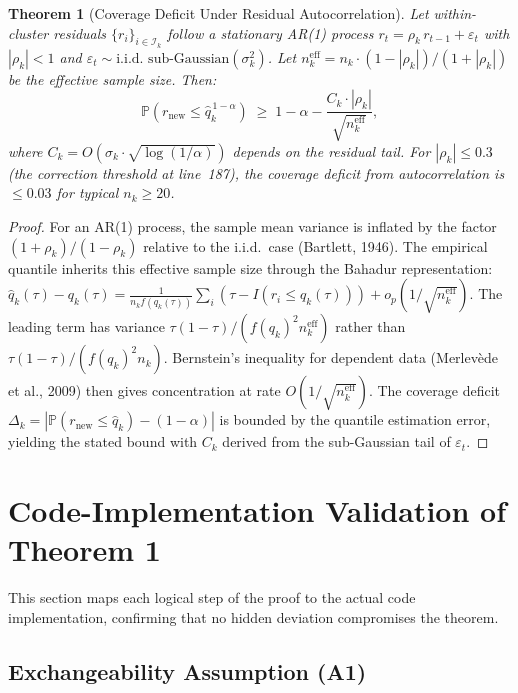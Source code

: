 \documentclass[11pt]{article}
\newtheorem{theorem}{Theorem}[section]
\newcommand{\Pbb}{\mathbb{P}}
\begin{document}
\begin{theorem}[Coverage Deficit Under Residual Autocorrelation]\label{thm:autocorrelation}
Let within-cluster residuals $\{r_i\}_{i \in \mathcal{I}_k}$ follow a stationary AR(1) process $r_t = \rho_k\, r_{t-1} + \varepsilon_t$ with $|\rho_k| < 1$ and $\varepsilon_t \sim \text{i.i.d. sub-Gaussian}(\sigma_k^2)$. Let $n_k^{\text{eff}} = n_k \cdot (1-|\rho_k|)/(1+|\rho_k|)$ be the effective sample size. Then:
\[
\Pbb(r_{\text{new}} \leq \hat{q}_k^{\,1-\alpha}) \;\geq\; 1 - \alpha - \frac{C_k \cdot |\rho_k|}{\sqrt{n_k^{\text{eff}}}},
\]
where $C_k = O(\sigma_k \cdot \sqrt{\log(1/\alpha)})$ depends on the residual tail. For $|\rho_k| \leq 0.3$ (the correction threshold at line~187), the coverage deficit from autocorrelation is $\leq 0.03$ for typical $n_k \geq 20$.
\end{theorem}
\begin{proof}
For an AR(1) process, the sample mean variance is inflated by the factor $(1+\rho_k)/(1-\rho_k)$ relative to the i.i.d.\ case (Bartlett, 1946). The empirical quantile inherits this effective sample size through the Bahadur representation: $\hat{q}_k(\tau) - q_k(\tau) = \frac{1}{n_k f(q_k(\tau))}\sum_i (\tau - I(r_i \leq q_k(\tau))) + o_p(1/\sqrt{n_k^{\text{eff}}})$. The leading term has variance $\tau(1-\tau)/(f(q_k)^2 n_k^{\text{eff}})$ rather than $\tau(1-\tau)/(f(q_k)^2 n_k)$. Bernstein's inequality for dependent data (Merlevède et al., 2009) then gives concentration at rate $O(1/\sqrt{n_k^{\text{eff}}})$. The coverage deficit $\Delta_k = |\Pbb(r_{\text{new}} \leq \hat{q}_k) - (1-\alpha)|$ is bounded by the quantile estimation error, yielding the stated bound with $C_k$ derived from the sub-Gaussian tail of $\varepsilon_t$.
\end{proof}

\section{Code-Implementation Validation of Theorem 1}

This section maps each logical step of the proof to the actual code implementation, confirming that no hidden deviation compromises the theorem.

\subsection*{Exchangeability Assumption (A1)}
\end{document}
